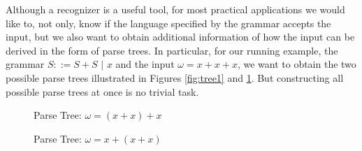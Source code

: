 %
\begin{isabellebody}%
%
%
\isadelimtheory
%
\endisadelimtheory
%
\isatagtheory
%
\endisatagtheory
{\isafoldtheory}%
%
\isadelimtheory
%
\endisadelimtheory
%
\isadelimdocument
%
\endisadelimdocument
%
\isatagdocument
%
\isamarkuptrue%
%
\endisatagdocument
{\isafolddocument}%
%
\isadelimdocument
%
\endisadelimdocument
%
\begin{isamarkuptext}%
Although a recognizer is a useful tool, for most practical applications we would like to, not only,
know if the language specified by the grammar accepts the input, but we also want to obtain additional information
of how the input can be derived in the form of parse trees. In particular, for our running example, the
grammar $S ::= S + S \,\, | \,\, x$ and the input $\omega = x + x + x$, we want to obtain the two possible parse
trees illustrated in Figures \ref{fig:tree1} and \ref{fig:tree2}. But constructing all possible parse trees at once is no
trivial task.

\begin{figure}[htpb]
    \centering
    \begin{minipage}{0.45\textwidth}
        \centering
        \caption{Parse Tree: $\omega = (x + x) + x$} \label{fig:tree1}
    \end{minipage}\hfill
    \begin{minipage}{0.45\textwidth}
        \centering
        \caption{Parse Tree: $\omega = x + (x + x)$} \label{fig:tree2}
    \end{minipage}
\end{figure}


\end{isamarkuptext}
\end{isabellebody}
